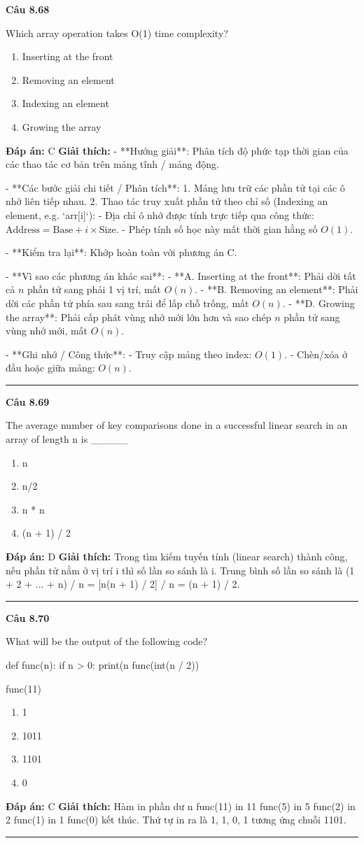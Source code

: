 \documentclass[11pt,a4paper]{article}
\newenvironment{question}[1]{%
  \par\vspace{1em}\noindent\textbf{\large Câu #1}\par\vspace{0.4em}
}{%
  \par\vspace{1em}\hrule\vspace{0.6em}
}
\newenvironment{choices}{%
  \begin{enumerate}[label=\textbf{\Alph*.},leftmargin=2.2em,itemsep=2pt,topsep=3pt]
}{%
  \end{enumerate}
}
\newcommand{\choice}{\item}
\newenvironment{codebox}{%
  \begin{tcolorbox}[colback=gray!8!white,colframe=gray!50!black,arc=1.5mm,boxrule=0.6pt,left=3mm,right=3mm,top=2.5mm,bottom=2.5mm]
  \ttfamily\small
}{%
  \end{tcolorbox}
}
\begin{document}
\begin{question}{8.68}
Which array operation takes O(1) time complexity?
\begin{choices}
\choice Inserting at the front
\choice Removing an element
\choice Indexing an element
\choice Growing the array
\end{choices}
\textbf{Đáp án:} C
\textbf{Giải thích:} - **Hướng giải**:
  Phân tích độ phức tạp thời gian của các thao tác cơ bản trên mảng tĩnh / mảng động.

- **Các bước giải chi tiết / Phân tích**:
  1. Mảng lưu trữ các phần tử tại các ô nhớ liên tiếp nhau.
  2. Thao tác truy xuất phần tử theo chỉ số (Indexing an element, e.g. `arr[i]`):
     - Địa chỉ ô nhớ được tính trực tiếp qua công thức: \(\text{Address} = \text{Base} + i \times \text{Size}\).
     - Phép tính số học này mất thời gian hằng số \(O(1)\).

- **Kiểm tra lại**:
  Khớp hoàn toàn với phương án C.

- **Vì sao các phương án khác sai**:
  - **A. Inserting at the front**: Phải dời tất cả \(n\) phần tử sang phải 1 vị trí, mất \(O(n)\).
  - **B. Removing an element**: Phải dời các phần tử phía sau sang trái để lấp chỗ trống, mất \(O(n)\).
  - **D. Growing the array**: Phải cấp phát vùng nhớ mới lớn hơn và sao chép \(n\) phần tử sang vùng nhớ mới, mất \(O(n)\).

- **Ghi nhớ / Công thức**:
  - Truy cập mảng theo index: \(O(1)\).
  - Chèn/xóa ở đầu hoặc giữa mảng: \(O(n)\).
\end{question}

\begin{question}{8.69}
The average number of key comparisons done in a successful linear search in an array of length n is _____
\begin{choices}
\choice n
\choice n/2
\choice n * n
\choice (n + 1) / 2
\end{choices}
\textbf{Đáp án:} D
\textbf{Giải thích:} Trong tìm kiếm tuyến tính (linear search) thành công, nếu phần tử nằm ở vị trí i thì số lần so sánh là i. Trung bình số lần so sánh là (1 + 2 + ... + n) / n = [n(n + 1) / 2] / n = (n + 1) / 2.
\end{question}

\begin{question}{8.70}
What will be the output of the following code?
\begin{codebox}
def func(n):
    if n > 0:
        print(n %
        func(int(n / 2))

func(11)
\end{codebox}
\begin{choices}
\choice 1
\choice 1011
\choice 1101
\choice 0
\end{choices}
\textbf{Đáp án:} C
\textbf{Giải thích:} Hàm in phần dư n %
func(11) in 11 %
func(5) in 5 %
func(2) in 2 %
func(1) in 1 %
func(0) kết thúc.
Thứ tự in ra là 1, 1, 0, 1 tương ứng chuỗi 1101.
\end{question}
\end{document}
